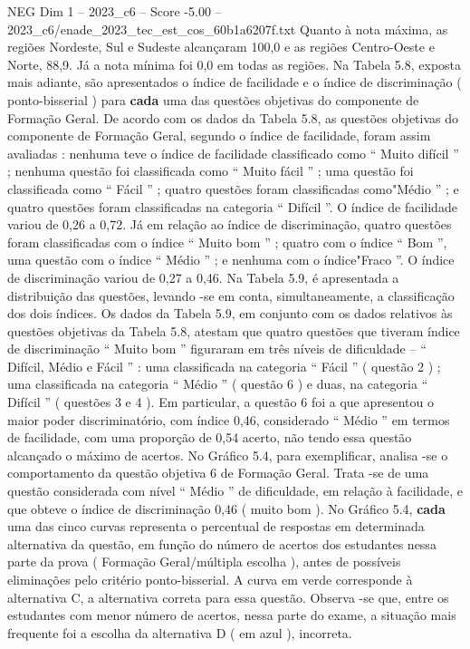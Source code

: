 \begin{textsample}{NEG Dim 1 – 2023\_c6 – Score -5.00 – 2023\_c6/enade\_2023\_tec\_est\_cos\_60b1a6207f.txt}
Quanto à nota máxima, as regiões Nordeste, Sul e Sudeste alcançaram 100,0 e as regiões Centro-Oeste e Norte, 88,9.
Já a nota mínima foi 0,0 em todas as regiões.
Na Tabela 5.8, exposta mais adiante, são apresentados o índice de facilidade e o índice de discriminação ( ponto-bisserial ) para \textbf{cada} uma das questões objetivas do componente de Formação Geral.
De acordo com os dados da Tabela 5.8, as questões objetivas do componente de Formação Geral, segundo o índice de facilidade, foram assim avaliadas : nenhuma teve o índice de facilidade classificado como “ Muito difícil ” ; nenhuma questão foi classificada como “ Muito fácil ” ; uma questão foi classificada como “ Fácil ” ; quatro questões foram classificadas como"Médio ” ; e quatro questões foram classificadas na categoria “ Difícil ”.
O índice de facilidade variou de 0,26 a 0,72.
Já em relação ao índice de discriminação, quatro questões foram classificadas com o índice “ Muito bom ” ; quatro com o índice “ Bom ”, uma questão com o índice “ Médio ” ; e nenhuma com o índice"Fraco ”.
O índice de discriminação variou de 0,27 a 0,46.
Na Tabela 5.9, é apresentada a distribuição das questões, levando -se em conta, simultaneamente, a classificação dos dois índices.
Os dados da Tabela 5.9, em conjunto com os dados relativos às questões objetivas da Tabela 5.8, atestam que quatro questões que tiveram índice de discriminação “ Muito bom ” figuraram em três níveis de dificuldade – “ Difícil, Médio e Fácil ” : uma classificada na categoria “ Fácil ” ( questão 2 ) ; uma classificada na categoria “ Médio ” ( questão 6 ) e duas, na categoria “ Difícil ” ( questões 3 e 4 ).
Em particular, a questão 6 foi a que apresentou o maior poder discriminatório, com índice 0,46, considerado “ Médio ” em termos de facilidade, com uma proporção de 0,54 acerto, não tendo essa questão alcançado o máximo de acertos.
No Gráfico 5.4, para exemplificar, analisa -se o comportamento da questão objetiva 6 de Formação Geral.
Trata -se de uma questão considerada com nível “ Médio ” de dificuldade, em relação à facilidade, e que obteve o índice de discriminação 0,46 ( muito bom ).
No Gráfico 5.4, \textbf{cada} uma das cinco curvas representa o percentual de respostas em determinada alternativa da questão, em função do número de acertos dos estudantes nessa parte da prova ( Formação Geral/múltipla escolha ), antes de possíveis eliminações pelo critério ponto-bisserial.
A curva em verde corresponde à alternativa C, a alternativa correta para essa questão.
Observa -se que, entre os estudantes com menor número de acertos, nessa parte do exame, a situação mais frequente foi a escolha da alternativa D ( em azul ), incorreta.

\end{textsample}
